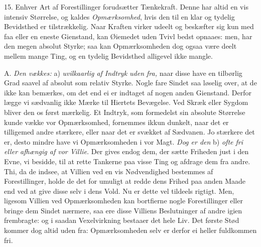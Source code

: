\documentclass[12pt,a4paper]{article}
\newcommand{\opage}[1]{\marginnote{\footnotesize\textit{[#1]}}}
\begin{document}
15. Enhver Art af Forestillinger forudsætter Tænkekraft. Denne har altid en vis
intensiv Størrelse, og kaldes \emph{Opmærksomhed}, hvis den til en klar og tydelig
Bevidsthed er tilstrækkelig. Naar Kraften virker udeelt og beskæfter sig kun med faa
eller en eneste Gienstand, kan Øiemedet uden Tvivl bedst opnaaes: men, har den megen
absolut Styrke; saa kan Opmærksomheden dog ogsaa være deelt mellem mange Ting, og en
tydelig Bevidsthed alligevel ikke mangle.

A. \emph{Den vækkes:} a) \emph{uvilkaarlig af Indtryk uden fra,} naar disse have en
tilbørlig Grad saavel af absolut som relativ Styrke. Nogle fare Sindet saa løselig
over, at de ikke kan bemærkes, om det end ei er indtaget af nogen anden Gienstand.
Derfor lægge vi sædvanlig ikke Mærke til Hiertets Bevægelse. Ved Skræk eller Sygdom
bliver den os først mærkelig. Et Indtryk, som formedelst sin absolute Størrelse kunde
vække vor Opmærksomhed, fornemmes ikkun dunkelt, naar det er tilligemed andre
stærkere, eller naar det er svækket af Sædvanen. Jo stærkere det er, desto mindre have
vi Opmærksomheden i vor Magt. \emph{Dog er den} b) \emph{ofte fri eller afhængig af
vor Villie.} Der gives endog dem, der sætte Friheden just i den Evne, vi besidde, til
at rette Tankerne paa visse Ting og afdrage dem fra andre. Thi, da de indsee, at
Villien ved en
\opage{56} vis Nødvendighed bestemmes af Forestillinger, holde de det for umuligt at redde dens
Frihed paa anden Maade end ved at give disse selv i dens Vold. Nu er dette vel
tildeels rigtigt. Men, ligesom Villien ved Opmærksomheden kan bortfierne nogle
Forestillinger eller bringe dem Sindet nærmere, saa ere disse Villiens Beslutninger af
andre igien frembragte: og i saadan Vexelvirkning bestaaer det hele Liv. Det første
Stød kommer dog altid uden fra: Opmærksomheden selv er derfor ei heller fuldkommen
fri.
\end{document}

